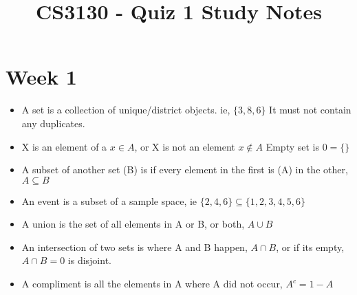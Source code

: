 \documentclass[12pt]{article}
\begin{document}
    \title{CS3130 - Quiz 1 Study Notes}


    \section{Week 1}
    \begin{itemize}
        \setlength\itemsep{0.1em}
        \item A set is a collection of unique/district objects. ie, $\{3,8,6\}$ It must not contain any duplicates.
        \item X is an element of a $x \in A$, or X is not an element $x \notin A$ Empty set is $ 0 = \{\}$
        \item A subset of another set (B) is if every element in the first is (A) in the other, $A \subseteq B$
        \item An event is a subset of a sample space, ie $\{2,4, 6\} \subseteq \{1,2,3,4,5,6\}$
        \item A union is the set of all elements in A or B, or both, $A \cup B$
        \item An intersection of two sets is where A and B happen, $A \cap B$, or if its empty, $A \cap B = 0$ is disjoint.
        \item A compliment is all the elements in A where A did not occur, $A^c = 1 - A$
    \end{itemize}
\end{document}
